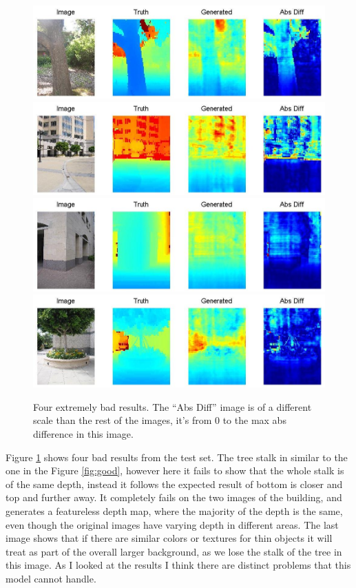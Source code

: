 \documentclass[journal]{IEEEtran}
\begin{document}
\begin{figure}
\label{fig:bad}
\centering
\includegraphics[width=\linewidth]{bad1.jpg} \\
\includegraphics[width=\linewidth]{bad2.jpg} \\
\includegraphics[width=\linewidth]{bad4.jpg} \\
\includegraphics[width=\linewidth]{bad3.jpg} \\
\caption{Four extremely bad results. The ``Abs Diff'' image is of a different scale than the rest of the images, it's from 0 to the max abs difference in this image.}
\end{figure}

Figure \ref{fig:bad} shows four bad results from the test set. The tree stalk in similar to the one in the Figure \ref{fig:good}, however here it fails to show that the whole stalk is of the same depth, instead it follows the expected result of bottom is closer and top and further away. It completely fails on the two images of the building, and generates a featureless depth map, where the majority of the depth is the same, even though the original images have varying depth in different areas. The last image shows that if there are similar colors or textures for thin objects it will treat as part of the overall larger background, as we lose the stalk of the tree in this image. As I looked at the results I think there are distinct problems that this model cannot handle.
\end{document}

